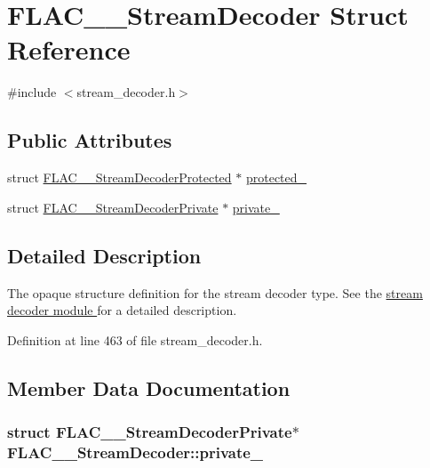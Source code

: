 \hypertarget{struct_f_l_a_c_____stream_decoder}{}\section{F\+L\+A\+C\+\_\+\+\_\+\+Stream\+Decoder Struct Reference}
\label{struct_f_l_a_c_____stream_decoder}


{\ttfamily \#include $<$stream\+\_\+decoder.\+h$>$}

\subsection*{Public Attributes}
\begin{DoxyCompactItemize}
\item 
struct \hyperlink{struct_f_l_a_c_____stream_decoder_protected}{F\+L\+A\+C\+\_\+\+\_\+\+Stream\+Decoder\+Protected} $\ast$ \hyperlink{struct_f_l_a_c_____stream_decoder_a17beb7a75f968592700bddec512f204d}{protected\+\_\+}
\item 
struct \hyperlink{struct_f_l_a_c_____stream_decoder_private}{F\+L\+A\+C\+\_\+\+\_\+\+Stream\+Decoder\+Private} $\ast$ \hyperlink{struct_f_l_a_c_____stream_decoder_a3a894a4d1204155c5a4e4add9d8f75f9}{private\+\_\+}
\end{DoxyCompactItemize}


\subsection{Detailed Description}
The opaque structure definition for the stream decoder type. See the \hyperlink{group__flac__stream__decoder}{stream decoder module } for a detailed description. 

Definition at line 463 of file stream\+\_\+decoder.\+h.



\subsection{Member Data Documentation}
\subsubsection[{\texorpdfstring{private\+\_\+}{private_}}]{\setlength{\rightskip}{0pt plus 5cm}struct {\bf F\+L\+A\+C\+\_\+\+\_\+\+Stream\+Decoder\+Private}$\ast$ F\+L\+A\+C\+\_\+\+\_\+\+Stream\+Decoder\+::private\+\_\+}\hypertarget{struct_f_l_a_c_____stream_decoder_a3a894a4d1204155c5a4e4add9d8f75f9}{}\label{struct_f_l_a_c_____stream_decoder_a3a894a4d1204155c5a4e4add9d8f75f9}


